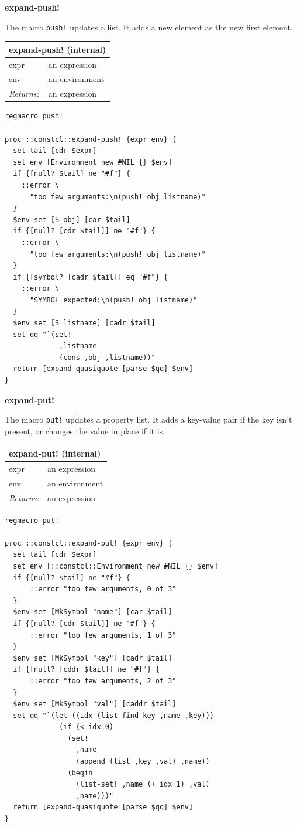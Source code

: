 \documentclass[twoside,9pt]{report}
\begin{document}
\textbf{expand-push!}


The macro \texttt{push!} updates a list. It adds a new element as the new first element.

\begin{tabular}{ |l l| }
\hline
\multicolumn{2}{|l|}{expand-push! (internal)} \\
\hline
expr & an expression \\
env & an environment \\
\textit{Returns:} & an expression \\
\hline
\end{tabular}

\noindent\makebox[\linewidth]{\rule{\linewidth}{0.4pt}}
\begin{lstlisting}
regmacro push!
 
proc ::constcl::expand-push! {expr env} {
  set tail [cdr $expr]
  set env [Environment new #NIL {} $env]
  if {[null? $tail] ne "#f"} {
    ::error \
      "too few arguments:\n(push! obj listname)"
  }
  $env set [S obj] [car $tail]
  if {[null? [cdr $tail]] ne "#f"} {
    ::error \
      "too few arguments:\n(push! obj listname)"
  }
  if {[symbol? [cadr $tail]] eq "#f"} {
    ::error \
      "SYMBOL expected:\n(push! obj listname)"
  }
  $env set [S listname] [cadr $tail]
  set qq "`(set!
             ,listname
             (cons ,obj ,listname))"
  return [expand-quasiquote [parse $qq] $env]
}
\end{lstlisting}
\noindent\makebox[\linewidth]{\rule{\linewidth}{0.4pt}}

\textbf{expand-put!}


The macro \texttt{put!} updates a property list. It adds a key-value pair if the key isn't present, or changes the value in place if it is.

\begin{tabular}{ |l l| }
\hline
\multicolumn{2}{|l|}{expand-put! (internal)} \\
\hline
expr & an expression \\
env & an environment \\
\textit{Returns:} & an expression \\
\hline
\end{tabular}

\noindent\makebox[\linewidth]{\rule{\linewidth}{0.4pt}}
\begin{lstlisting}
regmacro put!
 
proc ::constcl::expand-put! {expr env} {
  set tail [cdr $expr]
  set env [::constcl::Environment new #NIL {} $env]
  if {[null? $tail] ne "#f"} {
      ::error "too few arguments, 0 of 3"
  }
  $env set [MkSymbol "name"] [car $tail]
  if {[null? [cdr $tail]] ne "#f"} {
      ::error "too few arguments, 1 of 3"
  }
  $env set [MkSymbol "key"] [cadr $tail]
  if {[null? [cddr $tail]] ne "#f"} {
      ::error "too few arguments, 2 of 3"
  }
  $env set [MkSymbol "val"] [caddr $tail]
  set qq "`(let ((idx (list-find-key ,name ,key)))
             (if (< idx 0)
               (set! 
                 ,name
                 (append (list ,key ,val) ,name))
               (begin
                 (list-set! ,name (+ idx 1) ,val)
                 ,name)))"
  return [expand-quasiquote [parse $qq] $env]
}
\end{lstlisting}
\noindent\makebox[\linewidth]{\rule{\linewidth}{0.4pt}}
\end{document}
